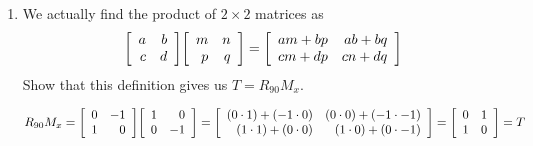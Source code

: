 \documentclass{letter}
\newcommand{\?}{\stackrel{?}{=}}
\newcommand\Que[1]{%
   \leavevmode\noindent
   #1
}
\newcommand\Ans[2][]{%
   \leavevmode\noindent
   {
       \begin{mdframed}[backgroundcolor=blue!10]
       #2
       \end{mdframed}
   }
}
\newenvironment{Mat}[1]{%
  \left[\begin{array}{*{#1}{r}}
}{%
  \end{array}\right]
}
\begin{document}
\begin{enumerate}
\begin{enumerate}[label=(\alph*)]
    \item \Que{
        We actually find the product of $2\times 2$ matrices as
        \begin{align*}
             \begin{Mat}{2}
              a & b \\
              c & d
            \end{Mat}
            \begin{Mat}{2}
              m & n \\
              p & q
            \end{Mat}     
            =
            \begin{Mat}{2}
              am+bp & ab+bq \\
              cm+dp & cn+dq
            \end{Mat}   
        \end{align*}
        Show that this definition gives us $T=R_{90}M_x$.
    }
    \Ans{
      \begin{align*}
        R_{90}M_x = 
        \begin{Mat}{2}
          0 & -1 \\
          1 & 0
        \end{Mat}
        \begin{Mat}{2}
          1 & 0 \\
          0 & -1
        \end{Mat}        
        =
        \begin{Mat}{2}
          (0 \cdot 1) + (-1\cdot 0) & (0\cdot 0) + (-1\cdot -1) \\
          (1 \cdot 1) + (0\cdot 0)  & (1\cdot 0) + (0\cdot -1)  
        \end{Mat}
        =
        \begin{Mat}{2}
          0 & 1 \\
          1 & 0
        \end{Mat}
        = T
      \end{align*}
    }
    

\end{enumerate}
\end{enumerate}
\end{document}

